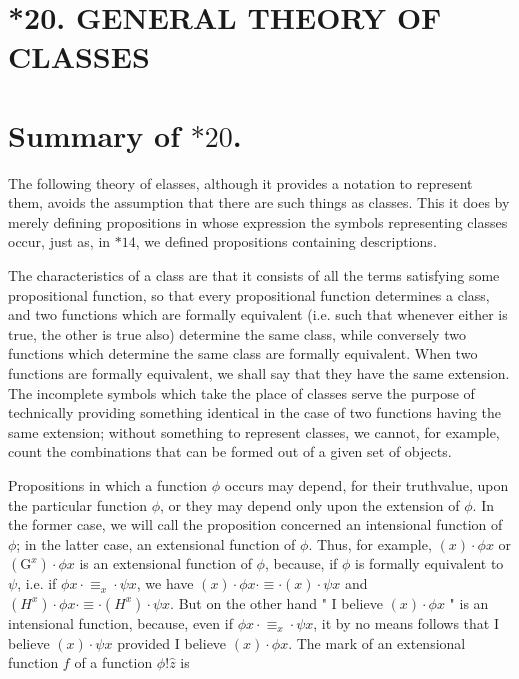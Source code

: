 \documentclass[10pt]{article}
\begin{document}
\section*{*20. GENERAL THEORY OF CLASSES}
\section*{Summary of $* 20$.}
The following theory of elasses, although it provides a notation to represent them, avoids the assumption that there are such things as classes. This it does by merely defining propositions in whose expression the symbols representing classes occur, just as, in $* 14$, we defined propositions containing descriptions.

The characteristics of a class are that it consists of all the terms satisfying some propositional function, so that every propositional function determines a class, and two functions which are formally equivalent (i.e. such that whenever either is true, the other is true also) determine the same class, while conversely two functions which determine the same class are formally equivalent. When two functions are formally equivalent, we shall say that they have the same extension. The incomplete symbols which take the place of classes serve the purpose of technically providing something identical in the case of two functions having the same extension; without something to represent classes, we cannot, for example, count the combinations that can be formed out of a given set of objects.

Propositions in which a function $\phi$ occurs may depend, for their truthvalue, upon the particular function $\phi$, or they may depend only upon the extension of $\phi$. In the former case, we will call the proposition concerned an intensional function of $\phi$; in the latter case, an extensional function of $\phi$. Thus, for example, $(x) \cdot \phi x$ or $\left(\mathrm{G}^{x}\right) \cdot \phi x$ is an extensional function of $\phi$, because, if $\phi$ is formally equivalent to $\psi$, i.e. if $\phi x \cdot \equiv_{x} \cdot \psi x$, we have $(x) \cdot \phi x \cdot \equiv \cdot(x) \cdot \psi x$ and $\left(H^{x}\right) \cdot \phi x \cdot \equiv \cdot\left(H^{x}\right) \cdot \psi x$. But on the other hand " I believe $(x) \cdot \phi x$ " is an intensional function, because, even if $\phi x \cdot \equiv_{x} \cdot \psi x$, it by no means follows that I believe $(x) \cdot \psi x$ provided I believe $(x) \cdot \phi x$. The mark of an extensional function $f$ of a function $\phi!\hat{z}$ is
\end{document}
